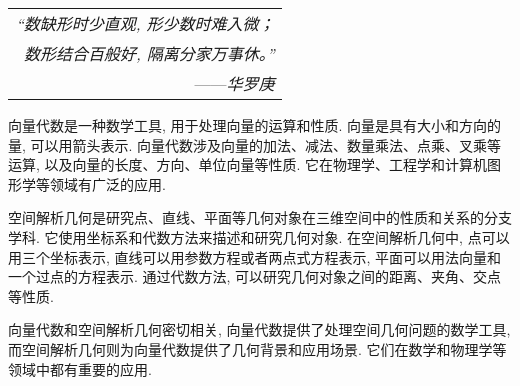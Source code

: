 \begin{flushright}
    \begin{tabular}{r|}
        \textit{“数缺形时少直观, 形少数时难入微；}\\
        \textit{数形结合百般好, 隔离分家万事休。”}\\
        ——\textit{华罗庚}
    \end{tabular}
\end{flushright}

向量代数是一种数学工具, 用于处理向量的运算和性质. 向量是具有大小和方向的量, 可以用箭头表示. 向量代数涉及向量的加法、减法、数量乘法、点乘、叉乘等运算, 以及向量的长度、方向、单位向量等性质. 它在物理学、工程学和计算机图形学等领域有广泛的应用. 

空间解析几何是研究点、直线、平面等几何对象在三维空间中的性质和关系的分支学科. 它使用坐标系和代数方法来描述和研究几何对象. 在空间解析几何中, 点可以用三个坐标表示, 直线可以用参数方程或者两点式方程表示, 平面可以用法向量和一个过点的方程表示. 通过代数方法, 可以研究几何对象之间的距离、夹角、交点等性质. 

向量代数和空间解析几何密切相关, 向量代数提供了处理空间几何问题的数学工具, 而空间解析几何则为向量代数提供了几何背景和应用场景. 它们在数学和物理学等领域中都有重要的应用. 